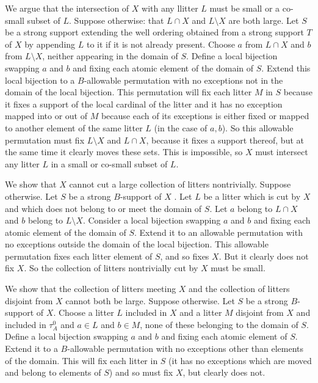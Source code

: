 \documentclass[12pt]{article}
\begin{document}
We argue that the intersection of $X$ with any llitter $L$ must be small or a co-small subset of $L$.  Suppose otherwise:  that $L \cap X$ and $L \setminus X$ are both large.
Let $S$ be a strong support extending the well ordering obtained from a strong support $T$ of $X$ by appending $L$ to it if it is not already present.  Choose $a$ from $L \cap X$ and $b$ from $L \setminus X$, neither appearing in the domain of $S$.  Define a local bijection swapping $a$ and $b$ and fixing each atomic element of the domain of $S$.  Extend this local bijection to
a $B$-allowable permutation with no exceptions not in the domain of the local bijection.  This permutation will fix each litter $M$ in $S$ because it fixes a support of the local cardinal of the litter
and it has no exception mapped into or out of $M$ because each of its exceptions is either fixed or mapped to another element of the same litter $L$ (in the case of $a,b$).
So this allowable permutation must fix $L \setminus X$ and $L \cap X$, because it fixes a support thereof, but at the same time it clearly moves these sets.  This is impossible,
so $X$ must intersect any litter $L$ in a small or co-small subset of $L$.

We show that $X$ cannot cut a large collection of litters nontrivially.  Suppose otherwise.  Let $S$ be a strong $B$-support of $X$ .  Let $L$ be a litter which is cut by $X$
and which does not belong to or meet the domain of $S$.  Let $a$ belong to $L \cap X$ and $b$ belong to $L \setminus X$.  Consider a local bijection swapping $a$ and $b$ and fixing each atomic element of the domain of $S$.  Extend it to an allowable permutation with no exceptions outside the domain of the local bijection.  This allowable permutation fixes each litter
element of $S$, and so fixes $X$.  But it clearly does not fix $X$.  So the collection of litters nontrivially cut by $X$ must be small.

We show that the collection of litters meeting $X$ and the collection of litters disjoint from $X$ cannot both be large.  Suppose otherwise.  Let $S$ be a strong $B$-support of $X$.
Choose a litter $L$ included in $X$ and a litter $M$ disjoint from $X$ and included in $\tau^0_A$  and $a \in L$ and $b \in M$, none of these belonging to the domain of $S$.  Define a local bijection swapping $a$ and $b$ and fixing each atomic element of $S$.  Extend it to a $B$-allowable permutation with no exceptions other than elements of the domain.  This will fix
each litter in $S$ (it has no exceptions which are moved and belong to elements of $S$) and so must fix $X$, but clearly does not.
\end{document}
